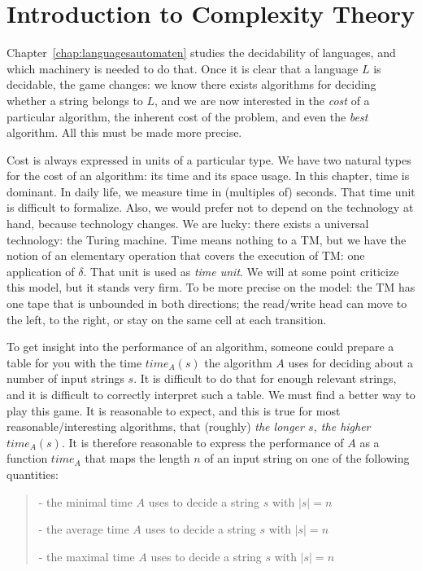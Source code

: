 \chapter{Introduction to Complexity Theory}


Chapter~\ref{chap:languagesautomaten} studies the decidability of
languages, and which machinery is needed to do that. Once it is clear
that a language $L$ is decidable, the game changes: we know there
exists algorithms for deciding whether a string belongs to $L$, and we
are now interested in the {\em cost} of a particular algorithm, the
inherent cost of the problem, and even the {\em best} algorithm. All
this must be made more precise.

Cost is always expressed in units of a particular type. We have two
natural types for the cost of an algorithm: its time and its space
usage. In this chapter, time is dominant. In daily life, we measure
time in (multiples of) seconds. That time unit is difficult to
formalize. Also, we would prefer not to depend on the technology at
hand, because technology changes. We are lucky: there exists a
universal technology: the Turing machine. Time means nothing to a TM,
but we have the notion of an elementary operation that covers the
execution of TM: one application of $\delta$. That unit is used as
{\em time unit}. We will at some point criticize this model, but it
stands very firm. To be more precise on the model: the TM has one
tape that is unbounded in both directions; the read/write head can
move to the left, to the right, or stay on the same cell at each
transition.

To get insight into the performance of an algorithm, someone could
prepare a table for you with the time $time_A(s)$ the algorithm $A$
uses for deciding about a number of input strings $s$.
It is difficult to do that for enough relevant strings, and it is
difficult to correctly interpret such a table. We must find a better
way to play this game. It is reasonable to expect, and this is true
for most reasonable/interesting algorithms, that (roughly) {\em the
longer $s$, the higher $time_A(s)$}. It is therefore reasonable to
express the performance of $A$ as a function $time_A$ that maps the
length $n$ of an input string on one of the following quantities:

\begin{verse}
- the minimal time $A$ uses to decide a  string $s$ with $|s| = n$

- the average time $A$ uses to decide a  string $s$ with $|s| = n$

- the maximal time $A$ uses to decide a  string $s$ with $|s| = n$
\end{verse}

